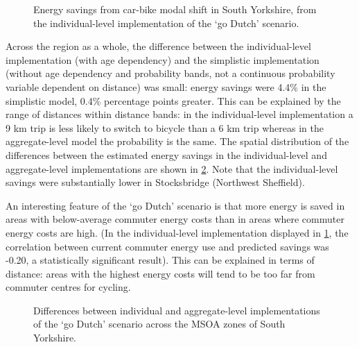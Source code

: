 \begin{figure}
 \caption[Energy savings from car-bike modal shift in South Yorkshire]
 {Energy savings from car-bike modal shift in South Yorkshire, from the
 individual-level implementation of the `go Dutch' scenario.} \label{fbikeage}
\end{figure}

Across the region as a whole, the difference between the individual-level
implementation (with age dependency) and the simplistic implementation
(without age dependency and probability bands, not a continuous probability
variable dependent on distance) was small: energy savings were 4.4\% in the
simplistic model, 0.4\% percentage points greater. This can be explained by the
range of distances within distance bands: in the individual-level implementation
a 9 km trip is less likely to switch to bicycle than a 6 km trip whereas
in the aggregate-level model the probability is the same. The spatial distribution
of the differences between the estimated energy savings in the individual-level
and aggregate-level implementations are shown in \cref{fcydif}. Note that the
individual-level savings were substantially lower in Stocksbridge (Northwest
Sheffield).

An interesting feature of the `go Dutch' scenario is that more energy is
saved in areas with below-average commuter energy costs than in areas where
commuter energy costs are high. (In the individual-level implementation
displayed in \cref{fbikeage}, the correlation between current commuter energy use
and predicted savings was -0.20, a statistically significant result).
This can be explained in terms of distance:
areas with the highest energy costs will tend to be too far from
commuter centres for cycling.

\begin{figure}
 \caption[Differences between individual and aggregate-level implementations]
 {Differences between individual and aggregate-level implementations of the
 `go Dutch' scenario across the MSOA zones of South Yorkshire.} \label{fcydif}
\end{figure}

